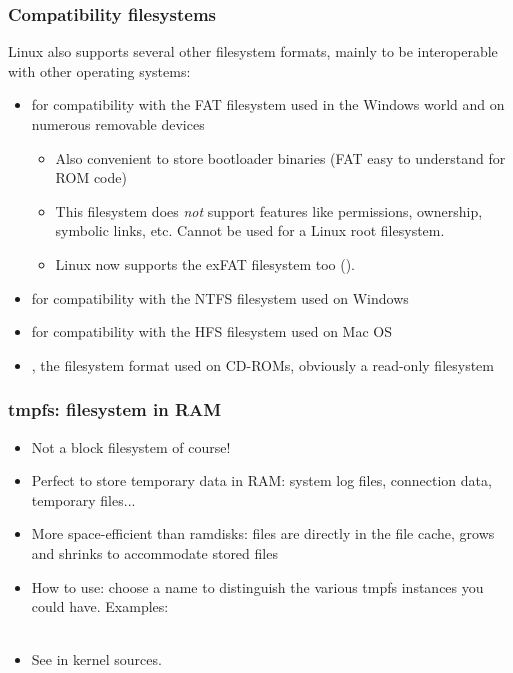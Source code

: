 \begin{frame}
  \frametitle{Compatibility filesystems}
  Linux also supports several other filesystem formats, mainly to be
  interoperable with other operating systems:
  \begin{itemize}
  \item {} for compatibility with the FAT filesystem used in
    the Windows world and on numerous removable devices
    \begin{itemize}
    \item Also convenient to store bootloader binaries (FAT easy
      to understand for ROM code)
    \item This filesystem does {\em not} support features like
      permissions, ownership, symbolic links, etc. Cannot be used for
      a Linux root filesystem.
    \item Linux now supports the exFAT filesystem too ().
    \end{itemize}
  \item {} for compatibility with the NTFS filesystem used on
    Windows
  \item {} for compatibility with the HFS filesystem used on
    Mac OS
  \item {}, the filesystem format used on CD-ROMs,
    obviously a read-only filesystem
  \end{itemize}
\end{frame}

\begin{frame}
  \frametitle{tmpfs: filesystem in RAM}
  \begin{itemize}
  \item Not a block filesystem of course!
  \item Perfect to store temporary data in RAM: system log files,
    connection data, temporary files...
  \item More space-efficient than ramdisks: files are directly in the
    file cache, grows and shrinks to accommodate stored files
  \item How to use: choose a name to distinguish the various tmpfs
    instances you could have. Examples:\\
    \\
  \item  See  in kernel sources.
  \end{itemize}
\end{frame}

